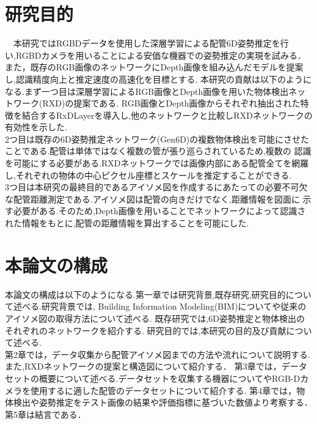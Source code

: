 \section{研究目的}
　本研究ではRGBDデータを使用した深層学習による配管6D姿勢推定を行い,RGBDカメラを用いることによる安価な機器での姿勢推定の実現を試みる．
また，既存のRGB画像のネットワークにDepth画像を組み込んだモデルを提案し,認識精度向上と推定速度の高速化を目標とする.
本研究の貢献は以下のようになる.まず一つ目は深層学習によるRGB画像とDepth画像を用いた物体検出ネットワーク(RXD)の提案である.
RGB画像とDepth画像からそれぞれ抽出された特徴を結合するRxDLayerを導入し,他のネットワークと比較しRXDネットワークの有効性を示した.\\
2つ目は既存の6D姿勢推定ネットワーク(Gen6D)の複数物体検出を可能にさせたことである.配管は単体ではなく複数の管が張り巡らされているため,複数の
認識を可能にする必要がある.RXDネットワークでは画像内部にある配管全てを網羅し,それぞれの物体の中心ピクセル座標とスケールを推定することができる.\\
3つ目は本研究の最終目的であるアイソメ図を作成するにあたっての必要不可欠な配管距離測定である.アイソメ図は配管の向きだけでなく,距離情報を図面に
示す必要がある.そのため,Depth画像を用いることでネットワークによって認識された情報をもとに,配管の距離情報を算出することを可能にした.

\section{本論文の構成}
 本論文の構成は以下のようになる.第一章では研究背景,既存研究,研究目的について述べる.研究背景では,
Building Information Modeling(BIM)についてや従来のアイソメ図の取得方法について述べる.
既存研究では,6D姿勢推定と物体検出のそれぞれのネットワークを紹介する.
研究目的では,本研究の目的及び貢献について述べる.\\
第2章では，データ収集から配管アイソメ図までの方法や流れについて説明する.また,RXDネットワークの提案と構造図について紹介する．
第3章では，データセットの概要について述べる.データセットを収集する機器についてやRGB-Dカメラを使用するに適した配管のデータセットについて紹介する.
第4章では，物体検出や姿勢推定をテスト画像の結果や評価指標に基づいた数値より考察する．
第5章は結言である．
